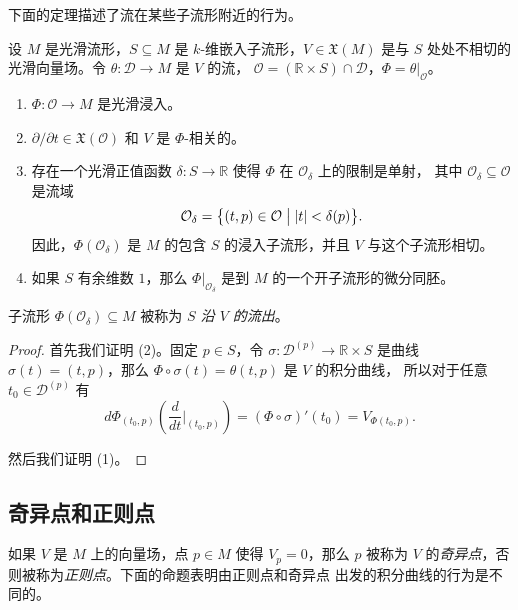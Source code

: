 下面的定理描述了流在某些子流形附近的行为。

\begin{theorem}[流出定理]
  设 $M$ 是光滑流形，$S\subseteq M$ 是 $k$-维嵌入子流形，$V\in \mathfrak{X}(M)$
  是与 $S$ 处处不相切的光滑向量场。令 $\theta:\mathcal{D}\to M$ 是 $V$ 的流，
  $\mathcal{O}=(\mathbb{R}\times S)\cap \mathcal{D}$，$\varPhi=\theta|_{\mathcal{O}}$。
  \begin{enumerate}
    \item $\varPhi:\mathcal{O}\to M$ 是光滑浸入。
    \item $\partial/\partial t\in \mathfrak{X}(\mathcal{O})$ 和 $V$ 是 $\varPhi$-相关的。
    \item 存在一个光滑正值函数 $\delta:S\to \mathbb{R}$ 使得 $\varPhi$ 在 $\mathcal{O}_\delta$ 上的限制是单射，
    其中 $\mathcal{O}_\delta\subseteq \mathcal{O}$ 是流域
    \begin{equation}
      \mathcal{O}_\delta=\bigl\{(t,p)\in \mathcal{O}\bigm| |t|<\delta(p)\bigr\}.
    \end{equation}
    因此，$\varPhi(\mathcal{O}_\delta)$ 是 $M$ 的包含 $S$ 的浸入子流形，并且 $V$
    与这个子流形相切。
    \item 如果 $S$ 有余维数 $1$，那么 $\varPhi|_{\mathcal{O}_\delta}$ 是到
    $M$ 的一个开子流形的微分同胚。
  \end{enumerate}
\end{theorem}
\begin{remark}
  子流形 $\varPhi(\mathcal{O}_\delta)\subseteq M$ 被称为 \emph{$S$ 沿 $V$ 的流出}。
\end{remark}
\begin{proof}
  首先我们证明 (2)。固定 $p\in S$，令 $\sigma:\mathcal{D}^{(p)}\to \mathbb{R}\times S$
  是曲线 $\sigma(t)=(t,p)$，那么 $\varPhi\circ\sigma(t)=\theta(t,p)$ 是 $V$ 的积分曲线，
  所以对于任意 $t_0\in \mathcal{D}^{(p)}$ 有
  \[
    d\varPhi_{(t_0,p)}\left(\frac{d}{dt}\bigg|_{(t_0,p)}\right)=
    (\varPhi\circ\sigma)'(t_0)=V_{\varPhi(t_0,p)}.
  \]

  然后我们证明 (1)。
\end{proof}

\subsection{奇异点和正则点}

如果 $V$ 是 $M$ 上的向量场，点 $p\in M$ 使得 $V_p=0$，那么 $p$ 被称为 $V$
的\emph{奇异点}，否则被称为\emph{正则点}。下面的命题表明由正则点和奇异点
出发的积分曲线的行为是不同的。

